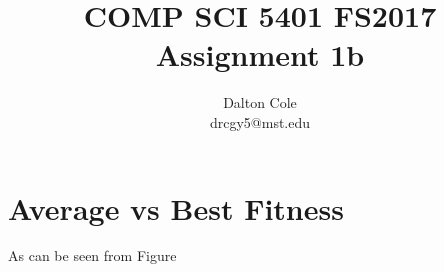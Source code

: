 \documentclass[times]{article}
\begin{document}
	\title{COMP SCI 5401 FS2017 Assignment 1b}
	\author{Dalton Cole \\ drcgy5@mst.edu}
	\date{}
	\maketitle

	\section{Average vs Best Fitness}
	As can be seen from Figure %


%	


	
		
\end{document}
